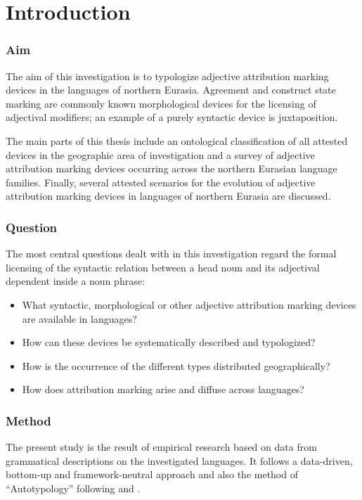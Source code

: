 
\chapter{Introduction}
\subsection*{Aim}
The aim of this investigation is to typologize adjective attribution marking devices in the languages of northern Eurasia. Agreement and construct state marking are commonly known morphological devices for the licensing of adjectival modifiers; an example of a purely syntactic device is juxtaposition.  

The main parts of this thesis include an ontological classification of all attested devices in the geographic area of investigation and a survey of adjective attribution marking devices occurring across the northern Eurasian language families. Finally, several attested scenarios for the evolution of adjective attribution marking devices in languages of northern Eurasia are discussed.

\subsection*{Question}
The most central questions dealt with in this investigation regard the formal licensing of the syntactic relation between a head noun and its adjectival dependent inside a noun phrase:
\begin{itemize}
\item What syntactic, morphological or other adjective attribution marking devices are available in languages? 
\item How can these devices be systematically described and typologized? 
\item How is the occurrence of the different types distributed geographically? 
\item How does attribution marking arise and diffuse across languages?
\end{itemize}

\subsection*{Method}
The present study is the result of empirical research based on data from grammatical descriptions on the investigated languages. It follows a data-driven, bottom-up and framework-neutral approach \citep[cf.][]{haspelmath2010} and also the method of “Autotypology” following \citet{bickel-etal2002} and \citet{bickel2007}.

